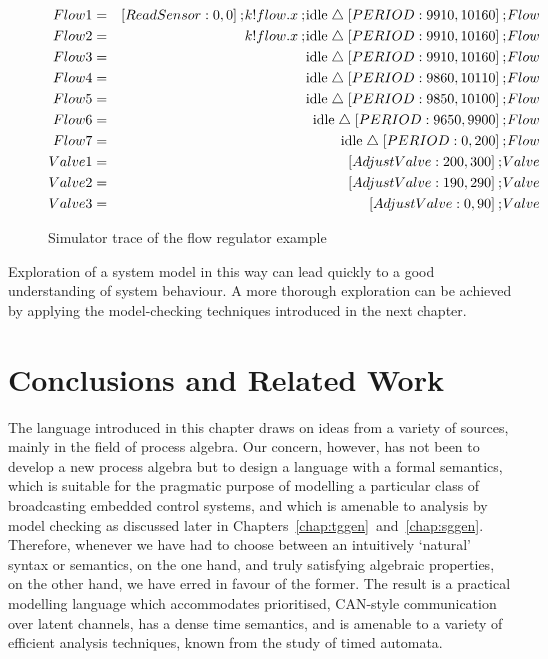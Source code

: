 \begin{figure}
\begin{eqnarray*}
Flow1 & = & [ReadSensor:0,0] \sq \kk!flow.\xx \sq \idle \interrupt [PERIOD:9910,10160] \sq Flow \\
Flow2 & = & \kk!flow.\xx \sq \idle \interrupt [PERIOD:9910,10160] \sq Flow \\
Flow3 & = & \idle \interrupt [PERIOD:9910,10160] \sq Flow \\
Flow4 & = & \idle \interrupt [PERIOD:9860,10110] \sq Flow \\
Flow5 & = & \idle \interrupt [PERIOD:9850,10100] \sq Flow \\
Flow6 & = & \idle \interrupt [PERIOD:9650,9900] \sq Flow \\
Flow7 & = & \idle \interrupt [PERIOD:0,200] \sq Flow \\
Valve1 & = & [AdjustValve:200,300] \sq Valve \\
Valve2 & = & [AdjustValve:190,290] \sq Valve \\
Valve3 & = & [AdjustValve:0,90] \sq Valve
\end{eqnarray*}
\caption{Simulator trace of the flow regulator example\label{fig:bcflowtrace}}
\end{figure}

Exploration of a system model in this way can lead quickly to a 
good understanding of system behaviour. A more thorough exploration
can be achieved by applying the model-checking techniques introduced
in the next chapter.

\section{Conclusions and Related Work}\label{sec:bcconc}
The language introduced in this chapter draws on ideas from a variety
of sources, mainly in the field of process algebra. Our concern,
however, has not been to develop a new process algebra but to design a
language with a formal semantics, which is suitable for the pragmatic
purpose of modelling a particular class of broadcasting embedded
control systems, and which is amenable to analysis by model checking
as discussed later in Chapters~\ref{chap:tggen}~and~\ref{chap:sggen}.
Therefore, whenever we have had to choose between an intuitively
`natural' syntax or semantics, on the one hand, and truly satisfying
algebraic properties, on the other hand, we have erred in favour of
the former.  The result is a practical modelling language which
accommodates prioritised, CAN-style communication over latent channels,
has a dense time semantics, and is amenable to a variety of efficient
analysis techniques, known from the study of timed automata.


